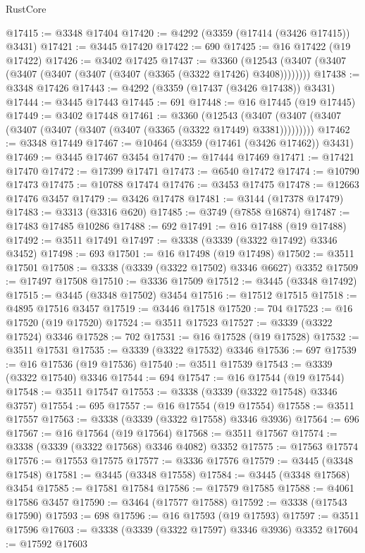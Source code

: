 \begin{lexlean}{RustCore}
\begin{coremodule}
@17415 := @3348 @17404
@17420 := @4292 (@3359 (@17414 (@3426 @17415)) @3431)
@17421 := @3445 @17420
@17422 := 690
@17425 := @16 @17422 (@19 @17422)
@17426 := @3402 @17425
@17437 := @3360
    (@12543 (@3407 (@3407 (@3407 (@3407 (@3407 (@3407 (@3365 (@3322 @17426) @3408))))))))
@17438 := @3348 @17426
@17443 := @4292 (@3359 (@17437 (@3426 @17438)) @3431)
@17444 := @3445 @17443
@17445 := 691
@17448 := @16 @17445 (@19 @17445)
@17449 := @3402 @17448
@17461 := @3360
    (@12543 (@3407 (@3407 (@3407 (@3407 (@3407 (@3407 (@3407 (@3365 (@3322 @17449) @3381)))))))))
@17462 := @3348 @17449
@17467 := @10464 (@3359 (@17461 (@3426 @17462)) @3431)
@17469 := @3445 @17467 @3454
@17470 := @17444 @17469
@17471 := @17421 @17470
@17472 := @17399 @17471
@17473 := @6540 @17472
@17474 := @10790 @17473
@17475 := @10788 @17474
@17476 := @3453 @17475
@17478 := @12663 @17476 @3457
@17479 := @3426 @17478
@17481 := @3144 (@17378 @17479)
@17483 := @3313 (@3316 @620)
@17485 := @3749 (@7858 @16874)
@17487 := @17483 @17485 @10286
@17488 := 692
@17491 := @16 @17488 (@19 @17488)
@17492 := @3511 @17491
@17497 := @3338 (@3339 (@3322 @17492) @3346 @3452)
@17498 := 693
@17501 := @16 @17498 (@19 @17498)
@17502 := @3511 @17501
@17508 := @3338 (@3339 (@3322 @17502) @3346 @6627) @3352
@17509 := @17497 @17508
@17510 := @3336 @17509
@17512 := @3445 (@3348 @17492)
@17515 := @3445 (@3348 @17502) @3454
@17516 := @17512 @17515
@17518 := @4895 @17516 @3457
@17519 := @3446 @17518
@17520 := 704
@17523 := @16 @17520 (@19 @17520)
@17524 := @3511 @17523
@17527 := @3339 (@3322 @17524) @3346
@17528 := 702
@17531 := @16 @17528 (@19 @17528)
@17532 := @3511 @17531
@17535 := @3339 (@3322 @17532) @3346
@17536 := 697
@17539 := @16 @17536 (@19 @17536)
@17540 := @3511 @17539
@17543 := @3339 (@3322 @17540) @3346
@17544 := 694
@17547 := @16 @17544 (@19 @17544)
@17548 := @3511 @17547
@17553 := @3338 (@3339 (@3322 @17548) @3346 @3757)
@17554 := 695
@17557 := @16 @17554 (@19 @17554)
@17558 := @3511 @17557
@17563 := @3338 (@3339 (@3322 @17558) @3346 @3936)
@17564 := 696
@17567 := @16 @17564 (@19 @17564)
@17568 := @3511 @17567
@17574 := @3338 (@3339 (@3322 @17568) @3346 @4082) @3352
@17575 := @17563 @17574
@17576 := @17553 @17575
@17577 := @3336 @17576
@17579 := @3445 (@3348 @17548)
@17581 := @3445 (@3348 @17558)
@17584 := @3445 (@3348 @17568) @3454
@17585 := @17581 @17584
@17586 := @17579 @17585
@17588 := @4061 @17586 @3457
@17590 := @3464 (@17577 @17588)
@17592 := @3338 (@17543 @17590)
@17593 := 698
@17596 := @16 @17593 (@19 @17593)
@17597 := @3511 @17596
@17603 := @3338 (@3339 (@3322 @17597) @3346 @3936) @3352
@17604 := @17592 @17603

\end{coremodule}
\end{lexlean}
